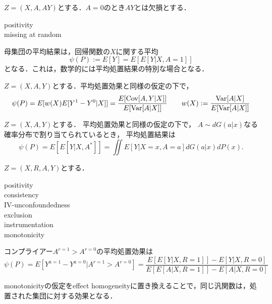\documentclass[uplatex,dvipdfmx]{jsreport}
\begin{document}
\begin{example}[平均欠損結果]
    $Z=(X,A,AY)$とする．$A=0$のとき$AY$とは欠損とする．
    \begin{description}
        \item[positivity] 
        \item[missing at random] 
    \end{description}
    母集団の平均結果は，回帰関数の$X$に関する平均
    \[\psi(P):=E[Y]=E[E[Y|X,A=1]]\]
    となる．これは，数学的には平均処置結果の特別な場合となる．
\end{example}

\begin{example}[平均で重みづけた処置効果]
    $Z=(X,A,Y)$とする．平均処置効果と同様の仮定の下で，
    \[\psi(P)=E[w(X)E[Y^1-Y^0|X]]=\frac{E[\mathrm{Cov}[A,Y|X]]}{E[\mathrm{Var}[A|X]]}\qquad w(X):=\frac{\mathrm{Var}[A|X]}{E[\mathrm{Var}[A|X]]}\]
\end{example}

\begin{example}[確率的介入効果]
    $Z=(X,A,Y)$とする．
    平均処置効果と同様の仮定の下で，
    $A\sim dG(a|x)$なる確率分布で割り当てられているとき，
    平均処置結果は
    \[\psi(P)=E[E[Y|X,A^*]]=\iint E[Y|X=x,A=a]dG(a|x)dP(x).\]
\end{example}

\begin{example}
    $Z=(X,R,A,Y)$とする．
    \begin{description}
        \item[positivity] 
        \item[consistency] 
        \item[IV-unconfoundedness] 
        \item[exclusion] 
        \item[instrumentation] 
        \item[monotonicity] 
    \end{description}
    コンプライアー$A^{r=1}>A^{r=0}$の平均処置効果は
    \[\psi(P)=E[Y^{a=1}-Y^{a=0}|A^{r=1}>A^{r=0}]=\frac{E[E[Y|X,R=1]]-E[Y|X,R=0]}{E[E[A|X,R=1]]-E[A|X,R=0]}\]

    monotonicityの仮定をeffect homogeneityに置き換えることで，同じ汎関数は，処置された集団に対する効果となる．
\end{example}

\begin{example}[時間変化する処置効果]
    
\end{example}
\end{document}

